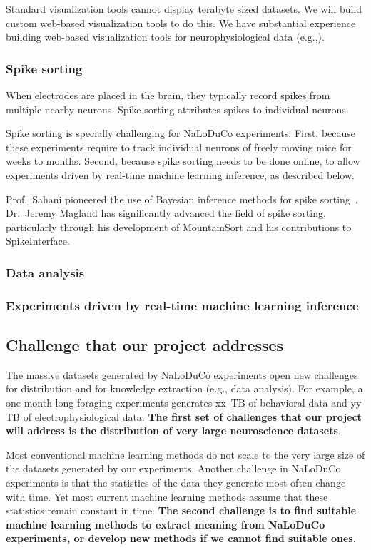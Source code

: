 Standard visualization tools cannot display terabyte sized datasets.
%
We will build custom web-based visualization tools to do this.
%
We have substantial experience building web-based visualization tools for
neurophysiological data (e.g.,).

\subsubsection{Spike sorting}

When electrodes are placed in the brain, they typically record spikes from
multiple nearby neurons. Spike sorting attributes spikes to individual neurons.

Spike sorting is specially challenging for NaLoDuCo experiments.
%
First, because these experiments require to track individual neurons of freely
moving mice for weeks to months.
%
Second, because spike sorting needs to be done online, to allow experiments
driven by real-time machine learning inference, as described below.

Prof.~Sahani pioneered the use of Bayesian inference methods for spike
sorting~\citep{sahaniPhDThesis}.
%
Dr.~Jeremy Magland has significantly advanced the field of spike sorting,
particularly through his development of MountainSort and his contributions to
SpikeInterface.

\subsubsection{Data analysis}

\subsubsection{Experiments driven by real-time machine learning inference}

\subsection{Challenge that our project addresses}

The massive datasets generated by NaLoDuCo
experiments open new challenges for distribution and for knowledge extraction
(e.g., data analysis). For example, a one-month-long foraging experiments
generates xx~TB of behavioral data and yy-TB of electrophysiological data.
%
\textbf{The first set of challenges that our project will address is the
distribution of very large neuroscience datasets}.

Most conventional machine learning methods do not scale to the very large size
of the datasets generated by our experiments.  Another challenge in NaLoDuCo
experiments is that the statistics of the data they generate most often change
with time. Yet most current machine learning methods assume that these
statistics remain constant in time.
%
\textbf{The second challenge is to find suitable machine learning methods to
extract meaning from NaLoDuCo experiments, or develop new methods if we cannot
find suitable ones}.

